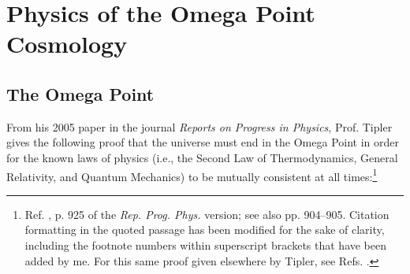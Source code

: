 \documentclass[letterpaper,12pt]{article}
\begin{document}
\section{Physics of the Omega Point Cosmology}
\label{sec:PhysicsOPT}

\subsection{The Omega Point}
\label{subsec:TheOmegaPoint}

From his 2005 paper in the journal \emph{Reports on Progress in Physics}, Prof. Tipler gives the following proof that the universe must end in the Omega Point in order for the known laws of physics (i.e., the Second Law of Thermodynamics, General Relativity, and Quantum Mechanics) to be mutually consistent at all times:\footnote{Ref. , p. 925 of the \emph{Rep. Prog. Phys.} version; see also pp. 904--905. Citation formatting in the quoted passage has been modified for the sake of clarity, including the footnote numbers within superscript brackets that have been added by me. For this same proof given elsewhere by Tipler, see Refs. .}
\end{document}
